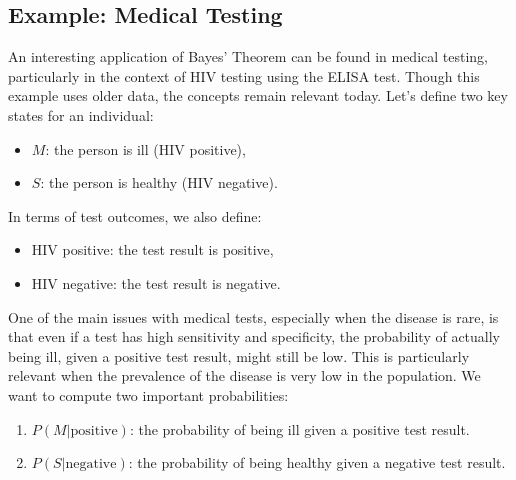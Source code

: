     \subsection{Example: Medical Testing}
    An interesting application of Bayes' Theorem can be found in medical testing, particularly in the context of HIV testing using the ELISA test. Though this example uses older data, the concepts remain relevant today. \newline
    Let's define two key states for an individual:
    \begin{itemize}
        \item \( M \): the person is ill (HIV positive),
        \item \( S \): the person is healthy (HIV negative).
    \end{itemize}
    In terms of test outcomes, we also define:
    \begin{itemize}
        \item HIV positive: the test result is positive,
        \item HIV negative: the test result is negative.
    \end{itemize}
    One of the main issues with medical tests, especially when the disease is rare, is that even if a test has high sensitivity and specificity, the probability of actually being ill, given a positive test result, might still be low. This is particularly relevant when the prevalence of the disease is very low in the population. \newline
    We want to compute two important probabilities:
    \begin{enumerate}
        \item \( P(M | \text{positive}) \): the probability of being ill given a positive test result.
        \item \( P(S | \text{negative}) \): the probability of being healthy given a negative test result.
    \end{enumerate}
    

